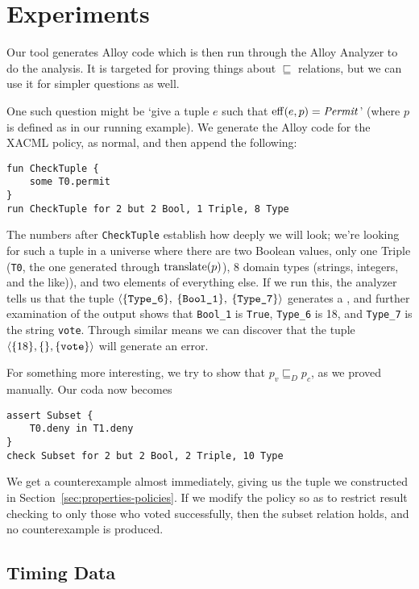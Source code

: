 \section{Experiments}
\label{sec:experiments}


Our tool generates Alloy code which is then run through the Alloy
Analyzer to do the analysis.  It is targeted for proving things about
$\sqsubseteq$ relations, but we can use it for simpler questions as
well.

One such question might be `give a tuple $e$ such that $\operatorname{eff} (e, p) =
\text{\textit{Permit}}$' (where $p$ is defined as in our running example).  We
generate the Alloy code for the XACML policy, as normal, and then
append the following:
\begin{verbatim}
fun CheckTuple {
    some T0.permit
}
run CheckTuple for 2 but 2 Bool, 1 Triple, 8 Type
\end{verbatim}
The numbers after \texttt{CheckTuple} establish how deeply we will
look; we're looking for such a tuple in a universe where there are two
Boolean values, only one Triple (\texttt{T0}, the one generated
through $\operatorname{translate}(p)$), 8 domain types (strings, integers, and the
like)), and two elements of everything else.  If we run this, the
analyzer tells us that the tuple $\langle \{ \text{\texttt{Type\_6}} \},$ $\{
\text{\texttt{Bool\_1}} \},$ $\{ \text{\texttt{Type\_7}} \} \rangle$ generates a
\Permit{}, and further examination of the output shows that
\texttt{Bool\_1} is \texttt{True}, \texttt{Type\_6} is 18, and
\texttt{Type\_7} is the string \texttt{vote}.  Through similar means
we can discover that the tuple $\langle \{ 18 \}, \{ \}, \{ \text{\texttt{vote}}
\} \rangle$ will generate an error.

For something more interesting, we try to show that $p_v \sqsubseteq_D
p_c$, as we proved manually.  Our coda now becomes
\begin{verbatim}
assert Subset {
    T0.deny in T1.deny
}
check Subset for 2 but 2 Bool, 2 Triple, 10 Type
\end{verbatim}
We get a counterexample almost immediately, giving us the tuple we
constructed in Section~\ref{sec:properties-policies}.  If we modify
the policy so as to restrict result checking to only those who voted
successfully, then the subset relation holds, and no counterexample is
produced.

\subsection{Timing Data}

